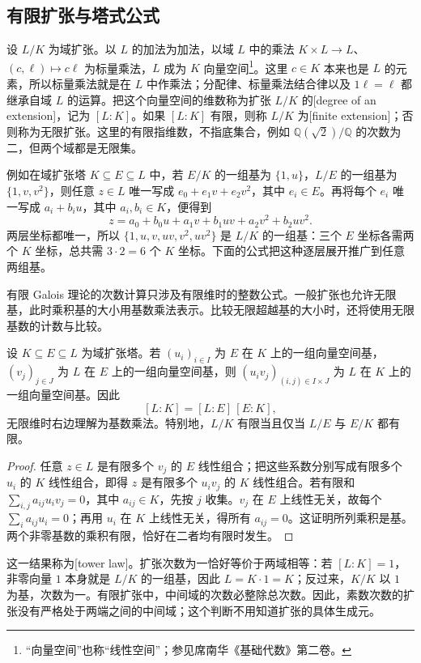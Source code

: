 \subsection{有限扩张与塔式公式}
\label{b1:subsec:1401:02}

设 \(L/K\) 为域扩张。以 \(L\) 的加法为加法，以域 \(L\) 中的乘法 \(K\times L\rightarrow L\)、\((c,\ell)\mapsto c\ell\) 为标量乘法，\(L\) 成为 \(K\) 向量空间\footnote{“向量空间”也称“线性空间”；参见席南华《基础代数》第二卷\cite[定义1.1, p. 1]{Xi2018BasicAlgebraII}。}。这里 \(c\in K\) 本来也是 \(L\) 的元素，所以标量乘法就是在 \(L\) 中作乘法；分配律、标量乘法结合律以及 \(1\ell=\ell\) 都继承自域 \(L\) 的运算。把这个向量空间的维数称为扩张 \(L/K\) 的[degree of an extension]，记为 \([L:K]\)。如果 \([L:K]\) 有限，则称 \(L/K\) 为[finite extension]；否则称为无限扩张。这里的有限指维数，不指底集合，例如 \(\mathbb Q(\sqrt2)/\mathbb Q\) 的次数为二，但两个域都是无限集。

\ProseParagraphBreak
例如在域扩张塔 \(K\subseteq E\subseteq L\) 中，若 \(E/K\) 的一组基为 \(\{1,u\}\)，\(L/E\) 的一组基为 \(\{1,v,v^2\}\)，则任意 \(z\in L\) 唯一写成 \(e_0+e_1v+e_2v^2\)，其中 \(e_i\in E\)。再将每个 \(e_i\) 唯一写成 \(a_i+b_i u\)，其中 \(a_i,b_i\in K\)，便得到
\[
	z=a_0+b_0u+a_1v+b_1uv+a_2v^2+b_2uv^2.
\]
两层坐标都唯一，所以 \(\{1,u,v,uv,v^2,uv^2\}\) 是 \(L/K\) 的一组基：三个 \(E\) 坐标各需两个 \(K\) 坐标，总共需 \(3\cdot2=6\) 个 \(K\) 坐标。下面的公式把这种逐层展开推广到任意两组基。

\ProseParagraphBreak
有限 Galois 理论的次数计算只涉及有限维时的整数公式。一般扩张也允许无限基，此时乘积基的大小用基数乘法表示。比较无限超越基的大小时，还将使用无限基数的计数与比较。

\begin{theorem}[塔式公式]\label{b1:thm:tower-law}
	设 \(K\subseteq E\subseteq L\) 为域扩张塔。若 \((u_i)_{i\in I}\) 为 \(E\) 在 \(K\) 上的一组向量空间基，\((v_j)_{j\in J}\) 为 \(L\) 在 \(E\) 上的一组向量空间基，则 \((u_iv_j)_{(i,j)\in I\times J}\) 为 \(L\) 在 \(K\) 上的一组向量空间基。因此
	\[
		[L:K]=[L:E]\,[E:K],
	\]
	无限维时右边理解为基数乘法。特别地，\(L/K\) 有限当且仅当 \(L/E\) 与 \(E/K\) 都有限。
\end{theorem}
\begin{proof}
	任意 \(z\in L\) 是有限多个 \(v_j\) 的 \(E\) 线性组合；把这些系数分别写成有限多个 \(u_i\) 的 \(K\) 线性组合，即得 \(z\) 是有限多个 \(u_iv_j\) 的 \(K\) 线性组合。若有限和 \(\sum_{i,j}a_{ij}u_iv_j=0\)，其中 \(a_{ij}\in K\)，先按 \(j\) 收集。\(v_j\) 在 \(E\) 上线性无关，故每个 \(\sum_i a_{ij}u_i=0\)；再用 \(u_i\) 在 \(K\) 上线性无关，得所有 \(a_{ij}=0\)。这证明所列乘积是基。两个非零基数的乘积有限，恰好在二者均有限时发生。
\end{proof}
这一结果称为[tower law]。扩张次数为一恰好等价于两域相等：若 \([L:K]=1\)，非零向量 \(1\) 本身就是 \(L/K\) 的一组基，因此 \(L=K\cdot1=K\)；反过来，\(K/K\) 以 \(1\) 为基，次数为一。有限扩张中，中间域的次数必整除总次数。因此，素数次数的扩张没有严格处于两端之间的中间域；这个判断不用知道扩张的具体生成元。

